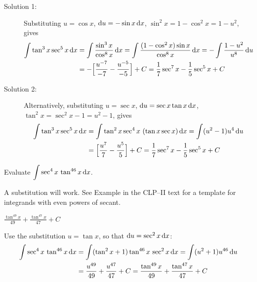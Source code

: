 \begin{solution}
\begin{description}
\item[Solution 1:]
Substituting $u=\cos x$, $\mathrm{d}u=-\sin x\,\mathrm{d}x$, $\sin^2 x= 1-\cos^2x=1-u^2$,
gives
\begin{align*}
\int \tan^3 x \sec^5x \,\mathrm{d}x
&=\int\frac{\sin^3 x}{\cos^8 x}\,\mathrm{d}x
=\int\frac{(1-\cos^2 x)\sin x}{\cos^8 x}\,\mathrm{d}x
=-\int\frac{1-u^2}{u^8}\,\mathrm{d}u \\
&=-\Big[\frac{u^{-7}}{-7}-\frac{u^{-5}}{-5}\Big]+C
=\frac{1}{7}\sec^7 x -\frac{1}{5}\sec^5 x + C
\end{align*}

\item[Solution 2:]
 Alternatively, substituting $u=\sec x$, $\mathrm{d}u=\sec x\tan x\,\mathrm{d}x$,
$\tan^2 x= \sec^2x-1=u^2-1$,
gives
\begin{align*}
\int \tan^3 x \sec^5x \,\mathrm{d}x
&=\int \tan^2 x \sec^4x\ (\tan x\sec x)\,\mathrm{d}x
=\int (u^2-1) u^4\,\mathrm{d}u \\
&=\Big[\frac{u^{7}}{7}-\frac{u^{5}}{5}\Big]+C
=\frac{1}{7}\sec^7 x -\frac{1}{5}\sec^5 x + C
\end{align*}
\end{description}
\end{solution}

\begin{Mquestion}[2016Q3]
Evaluate $\displaystyle\int\sec^4x\,\tan^{46}x\,\mathrm{d}x$.
\end{Mquestion}

\begin{hint}
 A substitution will work.
See Example  in the
CLP--II text for a template for integrands with even powers of secant.
\end{hint}

\begin{answer}
$\displaystyle\frac{\tan^{49}x}{49}+\frac{\tan^{47}x}{47}+C$
\end{answer}

\begin{solution}
Use the substitution $u=\tan x$, so that $\mathrm{d}u=\sec^2 x\,\mathrm{d}x$:
\begin{align*}
\int\sec^4x\,\tan^{46}x\,\mathrm{d}x
&=\int(\tan^2x+1) \tan^{46}x\, \sec^2 x\,\mathrm{d}x =\int (u^2+1)u^{46}\,\mathrm{d}u \\
&=\frac{u^{49}}{49}+\frac{u^{47}}{47}+C
=\frac{\tan^{49}x}{49}+\frac{\tan^{47}x}{47}+C
\end{align*}
\end{solution}



